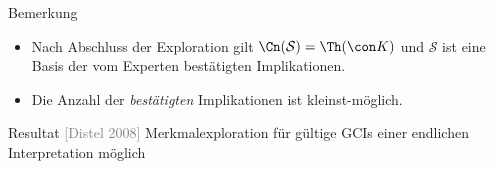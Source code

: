 \documentclass[ngerman]{beamer}
\newcommand{\pseudocite}[1]{\textcolor{gray}{[#1]}}
\begin{document}
\begin{frame}

  \vspace*{-4ex}
  \begin{block}{Bemerkung}
    \begin{itemize}
    \item<10-> Nach Abschluss der Exploration gilt $\Cn(\mathcal{S}) = \Th(\con K)$ und
      $\mathcal{S}$ ist eine Basis der vom Experten bestätigten Implikationen.
    \item<11-> Die Anzahl der \emph{bestätigten} Implikationen ist kleinst-möglich.
    \end{itemize}
  \end{block}


  \begin{block}{Resultat \pseudocite{Distel 2008}}
    Merkmalexploration für gültige GCIs einer endlichen Interpretation möglich
  \end{block}
  
\end{frame}
\end{document}
